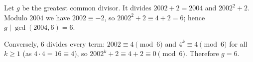 Let $g$ be the greatest common divisor. It divides $2002+2=2004$ and $2002^2+2$. Modulo $2004$ we have $2002\equiv-2$, so $2002^2+2\equiv4+2=6$; hence $g\mid\gcd(2004,6)=6$.

Conversely, $6$ divides every term: $2002\equiv4\pmod6$ and $4^k\equiv4\pmod6$ for all $k\ge1$ (as $4\cdot4=16\equiv4$), so $2002^k+2\equiv4+2\equiv0\pmod6$. Therefore $g=\boxed{6}$.
